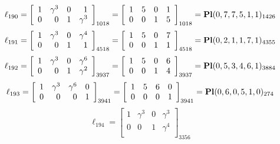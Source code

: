 \documentclass{article}
\begin{document}
{$$
\ell_{190} = 
\left[
\begin{array}{*{4}{r}}
1 & \gamma^{3} & 0 & 1\\
0 & 0 & 1 & \gamma^{3}\\
\end{array}
\right]
_{1018}
=
\left[
\begin{array}{*{4}c}
1  & 5  & 0  & 1\\
0  & 0  & 1  & 5\\
\end{array}
\right]_{1018}
={\rm\bf Pl}(0,7,7,5,1,1 )_{1426}$$
$$
\ell_{191} = 
\left[
\begin{array}{*{4}{r}}
1 & \gamma^{3} & 0 & \gamma^{4}\\
0 & 0 & 1 & 1\\
\end{array}
\right]
_{4518}
=
\left[
\begin{array}{*{4}c}
1  & 5  & 0  & 7\\
0  & 0  & 1  & 1\\
\end{array}
\right]_{4518}
={\rm\bf Pl}(0,2,1,1,7,1 )_{4355}$$
$$
\ell_{192} = 
\left[
\begin{array}{*{4}{r}}
1 & \gamma^{3} & 0 & \gamma^{6}\\
0 & 0 & 1 & \gamma^{2}\\
\end{array}
\right]
_{3937}
=
\left[
\begin{array}{*{4}c}
1  & 5  & 0  & 6\\
0  & 0  & 1  & 4\\
\end{array}
\right]_{3937}
={\rm\bf Pl}(0,5,3,4,6,1 )_{3884}$$
$$
\ell_{193} = 
\left[
\begin{array}{*{4}{r}}
1 & \gamma^{3} & \gamma^{6} & 0\\
0 & 0 & 0 & 1\\
\end{array}
\right]
_{3941}
=
\left[
\begin{array}{*{4}c}
1  & 5  & 6  & 0\\
0  & 0  & 0  & 1\\
\end{array}
\right]_{3941}
={\rm\bf Pl}(0,6,0,5,1,0 )_{274}$$
$$
\ell_{194} = 
\left[
\begin{array}{*{4}{r}}
1 & \gamma^{3} & 0 & \gamma^{3}\\
0 & 0 & 1 & \gamma^{4}\\
\end{array}
\right]
_{3356}
$$}
\end{document}
